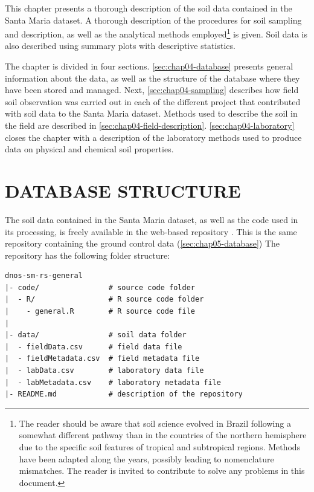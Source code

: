 \def\foottropics{\footnote{The reader should be aware that soil science evolved in Brazil following a somewhat 
different pathway than in the countries of the northern hemisphere due to the specific soil features of 
tropical and subtropical regions. Methods have been adapted along the years, possibly leading to nomenclature 
mismatches. The reader is invited to contribute to solve any problems in this document.}}

This chapter presents a thorough description of the soil data contained in the Santa Maria dataset. A 
thorough description of the procedures for soil sampling and description, as well as the analytical methods 
employed\foottropics{} is given. Soil data is also described using summary plots with descriptive statistics.

The chapter is divided in four sections. \autoref{sec:chap04-database} presents general information about 
the data, as well as the structure of the database where they have been stored and managed. Next, 
\autoref{sec:chap04-sampling} describes how field soil observation was carried out in each of the different 
project that contributed with soil data to the Santa Maria dataset. Methods used to describe the soil in the 
field are described in \autoref{sec:chap04-field-description}. \autoref{sec:chap04-laboratory} closes the 
chapter with a description of the laboratory methods used to produce data on physical and chemical soil 
properties.

\section{DATABASE STRUCTURE}
\label{sec:chap04-database}

The soil data contained in the Santa Maria dataset, as well as the code used in its processing, is freely 
available in the web-based \git{} repository \github{}. This is the same repository containing the ground 
control data (\autoref{sec:chap05-database}) The repository has the following folder structure:

\newpage

\begin{verbatim}
dnos-sm-rs-general
|- code/                # source code folder
|  - R/                 # R source code folder
|    - general.R        # R source code file
|
|- data/                # soil data folder
|  - fieldData.csv      # field data file
|  - fieldMetadata.csv  # field metadata file
|  - labData.csv        # laboratory data file
|  - labMetadata.csv    # laboratory metadata file
|- README.md            # description of the repository
\end{verbatim}

